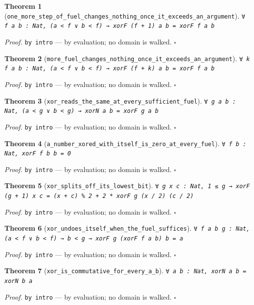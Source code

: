 \documentclass[11pt]{article}
\newtheorem{theorem}{Theorem}[section]
\begin{document}
\begin{theorem}[\texttt{one\_more\_step\_of\_fuel\_changes\_nothing\_once\_it\_exceeds\_an\_argument}]
\texttt{∀ f a b : Nat, (a < f ∨ b < f) → xorF (f + 1) a b = xorF f a b}
\end{theorem}
\noindent\emph{Proof.} \texttt{by
  intro} --- by evaluation; no domain is walked. \hfill$\square$

\begin{theorem}[\texttt{more\_fuel\_changes\_nothing\_once\_it\_exceeds\_an\_argument}]
\texttt{∀ k f a b : Nat, (a < f ∨ b < f) → xorF (f + k) a b = xorF f a b}
\end{theorem}
\noindent\emph{Proof.} \texttt{by
  intro} --- by evaluation; no domain is walked. \hfill$\square$

\begin{theorem}[\texttt{xor\_reads\_the\_same\_at\_every\_sufficient\_fuel}]
\texttt{∀ g a b : Nat, (a < g ∨ b < g) → xorN a b = xorF g a b}
\end{theorem}
\noindent\emph{Proof.} \texttt{by
  intro} --- by evaluation; no domain is walked. \hfill$\square$

\begin{theorem}[\texttt{a\_number\_xored\_with\_itself\_is\_zero\_at\_every\_fuel}]
\texttt{∀ f b : Nat, xorF f b b = 0}
\end{theorem}
\noindent\emph{Proof.} \texttt{by
  intro} --- by evaluation; no domain is walked. \hfill$\square$

\begin{theorem}[\texttt{xor\_splits\_off\_its\_lowest\_bit}]
\texttt{∀ g x c : Nat, 1 ≤ g → xorF (g + 1) x c = (x + c) \% 2 + 2 * xorF g (x / 2) (c / 2)}
\end{theorem}
\noindent\emph{Proof.} \texttt{by
  intro} --- by evaluation; no domain is walked. \hfill$\square$

\begin{theorem}[\texttt{xor\_undoes\_itself\_when\_the\_fuel\_suffices}]
\texttt{∀ f a b g : Nat, (a < f ∨ b < f) → b < g → xorF g (xorF f a b) b = a}
\end{theorem}
\noindent\emph{Proof.} \texttt{by
  intro} --- by evaluation; no domain is walked. \hfill$\square$

\begin{theorem}[\texttt{xor\_is\_commutative\_for\_every\_a\_b}]
\texttt{∀ a b : Nat, xorN a b = xorN b a}
\end{theorem}
\noindent\emph{Proof.} \texttt{by
  intro} --- by evaluation; no domain is walked. \hfill$\square$
\end{document}
